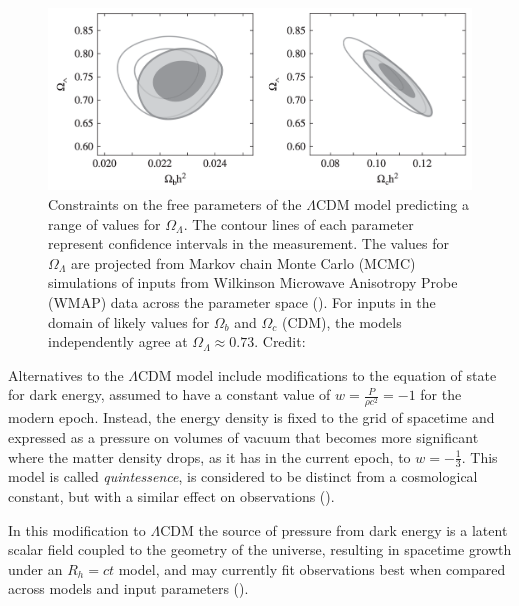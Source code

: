 \documentclass{paper}
\begin{document}
  \begin{figure}[H]
    \begin{centering}
    \includegraphics[scale=0.5]{DE-MCMC.pdf}
    \caption{Constraints on the free parameters of the $\Lambda$CDM
      model predicting a range of values for \(\Omega_{\Lambda}\). The contour 
      lines of each parameter represent confidence intervals in the 
      measurement. The values for \(\Omega_{\Lambda}\) are projected from
      Markov chain Monte Carlo (MCMC) simulations of inputs from Wilkinson 
      Microwave Anisotropy Probe (WMAP) data across the parameter space 
      (\cite{Bennett_2011}). For inputs in the domain of likely values for 
      \(\Omega_b\) and \(\Omega_c\) (CDM), the models independently agree at 
      \(\Omega_{\Lambda} \approx 0.73\).
    Credit: \cite{liddle2015introduction}}
    \label{fig:DE-MCMC}
    \end{centering}
  \end{figure}

  Alternatives to the $\Lambda$CDM model include
  modifications to the equation of state for dark energy, assumed to have a
  constant value of \(w = \frac{P}{\rho c^2} = -1\) for the modern epoch. 
  Instead, the energy density is fixed
  to the grid of spacetime and expressed as a pressure on volumes of
  vacuum that becomes more significant where the matter density drops, as it
  has in the current epoch, to \(w = -\frac{1}{3}\). This model is 
  called \textit{quintessence}, is considered to be distinct from a 
  cosmological constant, but with a similar effect on observations
  (\cite{PhysRevLett.80.1582}). 

  In this modification to $\Lambda$CDM the source of pressure from dark 
  energy is a latent scalar field coupled to the geometry of the universe, 
  resulting in spacetime growth under an \(R_h = ct\) model, and may currently 
  fit observations best when compared across models and input parameters 
  (\cite{10.1093/mnras/sty1962}).
\end{document}
